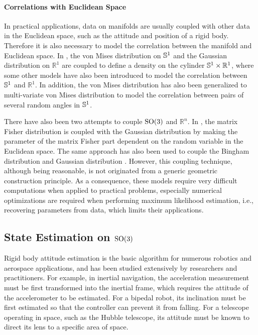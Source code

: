 \paragraph{Correlations with Euclidean Space}

In practical applications, data on manifolds are usually coupled with other data in the Euclidean space, such as the attitude and position of a rigid body.
Therefore it is also necessary to model the correlation between the manifold and Euclidean space.
In \cite{mardia1978model}, the von Mises distribution on $\mathbb{S}^1$ and the Gaussian distribution on $\mathbb{R}^1$ are coupled to define a density on the cylinder $\mathbb{S}^1 \times \mathbb{R}^1$, where some other models \cite{abe2017tractable,johnson1978some,kato2008dependent} have also been introduced to model the correlation between $\mathbb{S}^1$ and $\mathbb{R}^1$.
In addition, the von Mises distribution has also been generalized to multi-variate von Mises distribution \cite{mardia2008multivariate} to model the correlation between pairs of several random angles in $\mathbb{S}^1$.

There have also been two attempts to couple $\mathrm{SO}(3)$ and $\mathbb{R}^n$.
In \cite{markley2006attitude}, the matrix Fisher distribution is coupled with the Gaussian distribution by making the parameter of the matrix Fisher part dependent on the random variable in the Euclidean space.
The same approach has also been used to couple the Bingham distribution and Gaussian distribution \cite{darling2016uncertainty}.
However, this coupling technique, although being reasonable, is not originated from a generic geometric construction principle.
As a consequence, these models require very difficult computations when applied to practical problems, especially numerical optimizations are required when performing maximum likelihood estimation, i.e., recovering parameters from data, which limits their applications.

\subsection{State Estimation on $\mathrm{SO}(3)$} \label{section:intro-review-estimation}

Rigid body attitude estimation is the basic algorithm for numerous robotics and aerospace applications, and has been studied extensively by researchers and practitioners.
For example, in inertial navigation, the acceleration measurement must be first transformed into the inertial frame, which requires the attitude of the accelerometer to be estimated.
For a bipedal robot, its inclination must be first estimated so that the controller can prevent it from falling.
For a telescope operating in space, such as the Hubble telescope, its attitude must be known to direct its lens to a specific area of space.

